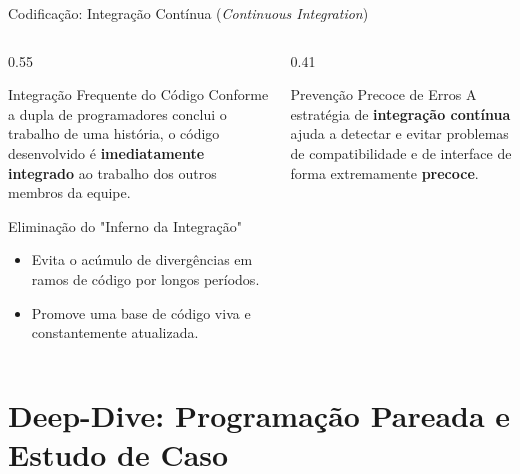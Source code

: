 \documentclass[aspectratio=169, 9pt]{beamer}
\begin{document}
\begin{frame}{Codificação: Integração Contínua (\textit{Continuous Integration})}
  \begin{columns}[T]
    \begin{column}{0.55\textwidth}
      \begin{block}{Integração Frequente do Código}
        Conforme a dupla de programadores conclui o trabalho de uma história, o código desenvolvido é \textbf{imediatamente integrado} ao trabalho dos outros membros da equipe.
      \end{block}

      \vspace{0.2cm}

      \begin{exampleblock}{Eliminação do "Inferno da Integração"}
        \begin{itemize}
          \item Evita o acúmulo de divergências em ramos de código por longos períodos.
          \item Promove uma base de código viva e constantemente atualizada.
        \end{itemize}
      \end{exampleblock}
    \end{column}

    \begin{column}{0.41\textwidth}
      \begin{alertblock}{Prevenção Precoce de Erros}
        A estratégia de \textbf{integração contínua} ajuda a detectar e evitar problemas de compatibilidade e de interface de forma extremamente \textbf{precoce}.
      \end{alertblock}
    \end{column}
  \end{columns}
\end{frame}


\section{Deep-Dive: Programação Pareada e Estudo de Caso}
\end{document}
